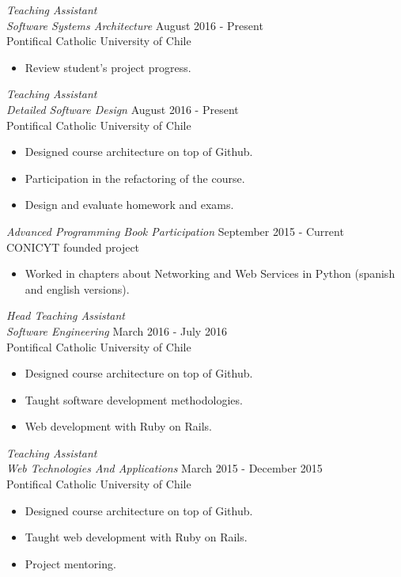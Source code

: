 \documentclass[margin, 10pt]{res} %
\begin{document}
\begin{resume}
{\sl Teaching Assistant \\Software Systems Architecture} \hfill August 2016 - Present \\
Pontifical Catholic University of Chile
\begin{itemize}  \itemsep -2pt
  \item Review student's project progress.
\end{itemize}

{\sl Teaching Assistant \\Detailed Software Design} \hfill August 2016 - Present \\
Pontifical Catholic University of Chile
\begin{itemize}  \itemsep -2pt
  \item Designed course architecture on top of Github.
  \item Participation in the refactoring of the course.
  \item Design and evaluate homework and exams.
\end{itemize}

{\sl Advanced Programming Book Participation} \hfill September 2015 - Current \\
CONICYT founded project
\begin{itemize}  \itemsep -2pt
\item Worked in chapters about Networking and Web Services in Python (spanish and english versions).
\end{itemize}

{\sl Head Teaching Assistant \\Software Engineering} \hfill March 2016 - July 2016 \\
Pontifical Catholic University of Chile
\begin{itemize}  \itemsep -2pt
  \item Designed course architecture on top of Github.
  \item Taught software development methodologies.
  \item Web development with Ruby on Rails.
\end{itemize}

{\sl Teaching Assistant \\Web Technologies And Applications} \hfill March 2015 - December 2015 \\
Pontifical Catholic University of Chile
\begin{itemize}  \itemsep -2pt
\item Designed course architecture on top of Github.
\item Taught web development with Ruby on Rails.
\item Project mentoring.
\end{itemize}


\end{resume}
\end{document}
